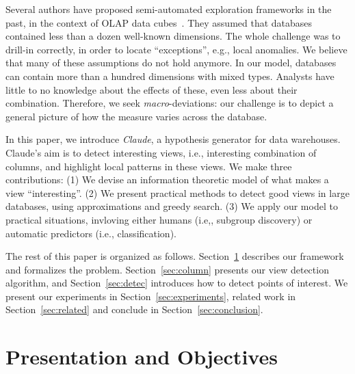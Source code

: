 Several authors have proposed semi-automated exploration frameworks in the
past, in the context of OLAP data cubes~\cite{sarawagi1998discovery,
imielinski2002cubegrades}. They assumed that databases contained less than a
dozen well-known dimensions.  The whole challenge was to drill-in correctly, in
order to locate ``exceptions'', e.g., local anomalies. We believe that many of
these assumptions do not hold anymore. In our model, databases can contain more
than a hundred dimensions with mixed types. Analysts have little to no
knowledge about the effects of these, even less about their combination.
Therefore, we seek \emph{macro}-deviations: our challenge is to depict a
general picture of how the measure varies across the database.

In this paper, we introduce \textit{Claude}, a hypothesis generator for data
warehouses. Claude's aim is to detect interesting views, i.e., interesting
combination of columns, and highlight local patterns in these views. We make
three contributions: (1) We devise an information theoretic model of what makes
a view ``interesting''. (2) We present practical methods to detect good views
in large databases, using approximations and greedy search. (3) We apply our
model to practical situations, invloving either humans (i.e,, subgroup
discovery) or automatic predictors (i.e., classification).

The rest of this paper is organized as follows. Section~\ref{sec:presentation}
describes our framework and formalizes the problem. Section~\ref{sec:column}
presents our view detection algorithm, and Section~\ref{sec:detec}
introduces how to detect points of interest. We present our experiments in
Section~\ref{sec:experiments}, related work in Section~\ref{sec:related} and
conclude in Section~\ref{sec:conclusion}.


\section{Presentation and Objectives}
\label{sec:presentation}

